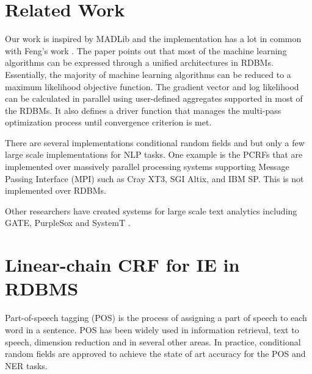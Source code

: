 \documentclass[11pt,letterpaper]{article}
\begin{document}
\section{Related Work}
Our work is inspired by MADLib \cite{Hellerstein:2012:MAL:2367502.2367510} and the implementation has a lot in common with 
Feng's work \cite{Feng:2012:TUA:2213836.2213874}.
The paper points out that most of the machine learning algorithms can be expressed through
a unified architectures in RDBMs.
Essentially, the majority of machine learning algorithms can be reduced to a maximum likelihood objective function. %
The gradient vector and log likelihood can be calculated in parallel using user-defined aggregates supported in most of the RDBMs.
It also defines a driver function that manages the multi-pass optimization process until convergence criterion is met.

There are several implementations conditional random fields and but only a few 
large scale implementations for NLP tasks.
One example is the PCRFs \cite{phan2004flexcrfs} that are implemented over
massively parallel processing systems supporting Message Passing Interface (MPI) such as 
Cray XT3, SGI Altix, and IBM SP.
This is not implemented over RDBMs.

Other researchers have created systems for large scale text analytics including 
GATE, PurpleSox and SystemT
\cite{Cunningham2011a,Bohannon:2009:PSE:1519103.1519107,Li:2011:SDI:2002440.2002459}. 


\section{Linear-chain CRF for IE in RDBMS}
Part-of-speech tagging (POS) is the process of assigning 
a part of speech to each word in a sentence. 
POS has been widely used in information retrieval, text to speech, dimension reduction and in several other areas. 
In practice, conditional random fields are approved to achieve the state of art accuracy for the POS and NER tasks.
\end{document}
